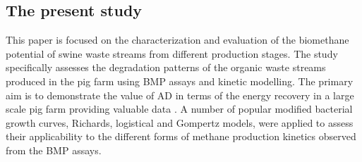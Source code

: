 \subsection{The present study}
This paper is focused on the characterization and evaluation of the biomethane potential of swine waste streams from different production stages. The study specifically assesses the degradation patterns of the organic waste streams produced in the pig farm using BMP assays and kinetic modelling. The primary aim is to demonstrate the value of AD in terms of the energy recovery in a large scale pig farm providing valuable data . A number of popular modified bacterial growth curves, Richards, logistical and Gompertz models, were applied to assess their applicability to the different forms of methane production kinetics observed from the BMP assays.